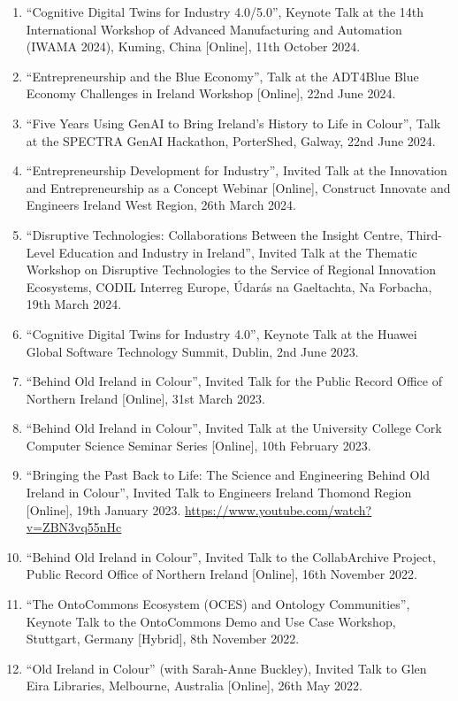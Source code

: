 \documentclass[10pt,a4paper]{res} %
\begin{document}
\begin{resume}
\begin{enumerate} \itemsep -2pt
\item ``Cognitive Digital Twins for Industry 4.0/5.0'', Keynote Talk at the 14th International Workshop of Advanced Manufacturing and Automation (IWAMA 2024), Kuming, China [Online], 11th October 2024.
\item ``Entrepreneurship and the Blue Economy'', Talk at the ADT4Blue Blue Economy Challenges in Ireland Workshop [Online], 22nd June 2024.
\item ``Five Years Using GenAI to Bring Ireland's History to Life in Colour'', Talk at the SPECTRA GenAI Hackathon, PorterShed, Galway, 22nd June 2024.
\item ``Entrepreneurship Development for Industry'', Invited Talk at the Innovation and Entrepreneurship as a Concept Webinar [Online], Construct Innovate and Engineers Ireland West Region, 26th March 2024.
\item ``Disruptive Technologies: Collaborations Between the Insight Centre, Third-Level Education and Industry in Ireland'', Invited Talk at the Thematic Workshop on Disruptive Technologies to the Service of Regional Innovation Ecosystems, CODIL Interreg Europe, \'{U}dar\'{a}s na Gaeltachta, Na Forbacha, 19th March 2024.
\item ``Cognitive Digital Twins for Industry 4.0'', Keynote Talk at the Huawei Global Software Technology Summit, Dublin, 2nd June 2023.
\item ``Behind Old Ireland in Colour'', Invited Talk for the Public Record Office of Northern Ireland [Online], 31st March 2023.
\item ``Behind Old Ireland in Colour'', Invited Talk at the University College Cork Computer Science Seminar Series [Online], 10th February 2023.
\item ``Bringing the Past Back to Life: The Science and Engineering Behind Old Ireland in Colour'', Invited Talk to Engineers Ireland Thomond Region [Online], 19th January 2023. \url{https://www.youtube.com/watch?v=ZBN3vq55nHc}
\item ``Behind Old Ireland in Colour'', Invited Talk to the CollabArchive Project, Public Record Office of Northern Ireland [Online], 16th November 2022.
\item ``The OntoCommons Ecosystem (OCES) and Ontology Communities'', Keynote Talk to the OntoCommons Demo and Use Case Workshop, Stuttgart, Germany [Hybrid], 8th November 2022.
\item ``Old Ireland in Colour'' (with Sarah-Anne Buckley), Invited Talk to Glen Eira Libraries, Melbourne, Australia [Online], 26th May 2022.

\end{enumerate}
\end{resume}
\end{document}
